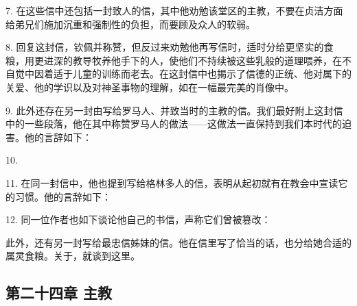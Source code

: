 7. 在这些信中还包括一封致人的信，其中他劝勉该堂区的主教，不要在贞洁方面给弟兄们施加沉重和强制性的负担，而要顾及众人的软弱。\par

8. 回复这封信，钦佩并称赞，但反过来劝勉他再写信时，适时分给更坚实的食粮，用更进深的教导牧养他手下的人，使他们不持续被这些乳般的道理喂养，在不自觉中因着适于儿童的训练而老去。在这封信中也揭示了信德的正统、他对属下的关爱、他的学识以及对神圣事物的理解，如在一幅最完美的肖像中。\par

9. 此外还存在另一封由写给罗马人、并致当时的主教的信。我们最好附上这封信中的一些段落，他在其中称赞罗马人的做法——这做法一直保持到我们本时代的迫害。他的言辞如下：\par

10. \par

11. 在同一封信中，他也提到写给格林多人的信，表明从起初就有在教会中宣读它的习惯。他的言辞如下：\par

12. 同一位作者也如下谈论他自己的书信，声称它们曾被篡改：\par

此外，还有另一封写给最忠信姊妹的信。他在信里写了恰当的话，也分给她合适的属灵食粮。关于，就谈到这里。\par


\subsection{第二十四章 主教}

